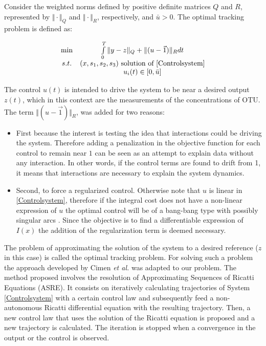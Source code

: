 \documentclass[3p,times]{article}
\begin{document}
 Consider the weighted norms defined by positive definite matrices $Q$ and $R$, represented by $\Vert \cdot \Vert_Q$ and $\Vert \cdot \Vert_R$, respectively, and $\bar{u}>0$. The optimal tracking problem is defined as: 

\begin{align}
\label{Optimal Control} \begin{array}{cc} \min &  \int \limits_{0}^{T} \Vert y - z \Vert_Q + \Vert(u -\vec{1}) \Vert_R dt\\
s.t.& 
(x,s_1,s_2,s_3)\mbox{ solution of \eqref{Controlsystem}} \\
&u_i(t) \in [0,\bar{u}]
\end{array}	
\end{align} 

The control $u(t)$ is intended to drive the system to be near a desired output $z(t)$, which in this context are the measurements of the concentrations of OTU. The term $\Vert(u -\vec{1}) \Vert_R$, was added for two reasons:
\begin{itemize}
\item First because the interest is testing the idea that interactions could be driving the system. Therefore adding a penalization in the objective function for each control to remain near $1$ can be seen as an attempt to explain data without any interaction. In other words, if the control terms are found to drift from 1, it means that interactions are necessary to explain the system dynamics.

\item Second, to force a regularized control. Otherwise note that $u$ is linear in \eqref{Controlsystem}, therefore if the integral cost does not have a non-linear expression of $u$ the optimal control will be of a bang-bang type with possibly singular arcs \cite{harmand2019optimal}. Since the objective is to find a differentiable expression of $I(x)$ the addition of the regularization term is deemed necessary.
\end{itemize} 
The problem of approximating the solution of the system to a desired reference ($z$ in this case) is called the optimal tracking problem. For solving such a problem the approach developed by Cimen \textit{et al.} \cite{Cimen2004, Cimen2008} was adapted to our problem. The method proposed involves the resolution of Approximating Sequences of Ricatti Equations (ASRE). It consists on iteratively calculating trajectories of System \eqref{Controlsystem} with a certain control law and subsequently feed a non-autonomous Ricatti differential equation with the resulting trajectory. Then, a new control law that uses the solution of the Ricatti equation is proposed and a new trajectory is calculated. The iteration is stopped when a convergence in the output or  the control is observed.
\end{document}
